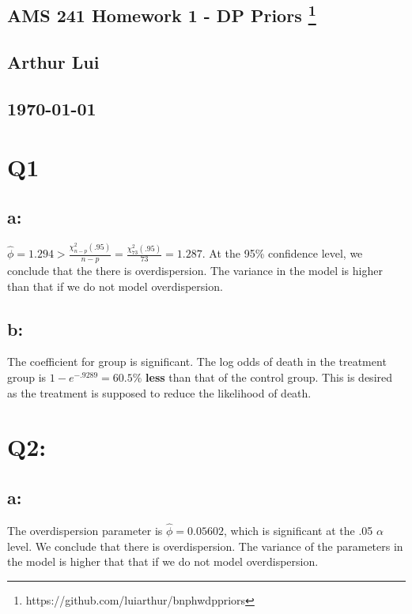 \documentclass{article}
\def\tu{\textunderscore}
\begin{document}
\begin{center}
  \section*{\textbf{AMS 241 Homework 1 - DP Priors}
    \footnote{https://github.com/luiarthur/bnp\tu hw\tu dp\tu priors}
  } 
  \subsection*{\textbf{Arthur Lui}}
  \subsection*{\noindent\today}
\end{center}


\section*{Q1}
\subsection*{a:}
$\hat\phi = 1.294 > \frac{\chi^2_{n-p}(.95)}{n-p} =
\frac{\chi^2_{73}(.95)}{73} = 1.287$. At the 95\% confidence level, we
conclude that the there is overdispersion. The variance in the model is
higher than that if we do not model overdispersion.

\subsection*{b:}
The coefficient for group is significant. The log odds of death in the
treatment group is $1-e^{-.9289}=60.5\%$ \textbf{less} than that of the
control group. This is desired as the treatment is supposed to reduce the
likelihood of death.

\section*{Q2:}
\subsection*{a:}
The overdispersion parameter is $\hat\phi=0.05602$, which is significant at
the .05 $\alpha$ level. We conclude that there is overdispersion. The
variance of the parameters in the model is higher that that if we do not
model overdispersion.
\end{document}
